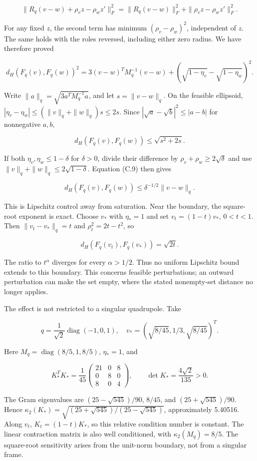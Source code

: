 \documentclass[
  11pt,
  a4paper]{article}
\begin{document}
\[
\|R_q(v-w)+\rho_vz-\rho_wz'\|_F^2
=\|R_q(v-w)\|_F^2+\|\rho_vz-\rho_wz'\|_F^2.
\]

For any fixed \(z\), the second term has minimum \((\rho_v-\rho_w)^2\), independent of \(z\). The same holds with the roles reversed, including either zero radius. We have therefore proved

\[
\boxed{d_H(F_q(v),F_q(w))^2
=3(v-w)^TM_q^{-1}(v-w)
+(\sqrt{1-\eta_v}-\sqrt{1-\eta_w})^2.}
\tag{C.9}
\]

Write \(\|a\|_q=\sqrt{3a^TM_q^{-1}a}\), and let \(s=\|v-w\|_q\). On the feasible ellipsoid,
\(|\eta_v-\eta_w|\le(\|v\|_q+\|w\|_q)s\le2s\).
Since \(|\sqrt a-\sqrt b|^2\le|a-b|\) for nonnegative \(a,b\),

\[
d_H(F_q(v),F_q(w))\le\sqrt{s^2+2s}.
\tag{C.10}
\]

If both \(\eta_v,\eta_w\le1-\delta\) for \(\delta>0\), divide their difference by \(\rho_v+\rho_w\ge2\sqrt\delta\) and use \(\|v\|_q+\|w\|_q\le2\sqrt{1-\delta}\). Equation (C.9) then gives

\[
d_H(F_q(v),F_q(w))\le\delta^{-1/2}\|v-w\|_q.
\tag{C.11}
\]

This is Lipschitz control away from saturation. Near the boundary, the square-root exponent is exact. Choose \(v_*\) with \(\eta_*=1\) and set \(v_t=(1-t)v_*\), \(0<t<1\). Then \(\|v_t-v_*\|_q=t\) and \(\rho_t^2=2t-t^2\), so

\[
\boxed{d_H(F_q(v_t),F_q(v_*))=\sqrt{2t}.}
\tag{C.12}
\]

The ratio to \(t^\alpha\) diverges for every \(\alpha>1/2\). Thus no uniform Lipschitz bound extends to this boundary. This concerns feasible perturbations; an outward perturbation can make the set empty, where the stated nonempty-set distance no longer applies.

The effect is not restricted to a singular quadrupole. Take

\[
q=\frac1{\sqrt2}\operatorname{diag}(-1,0,1),\quad
v_*=(\sqrt{8/45},1/3,\sqrt{8/45})^T.
\tag{C.13}
\]

Here \(M_q=\operatorname{diag}(8/5,1,8/5)\), \(\eta_*=1\), and

\[
K_*^TK_*=\frac1{45}
\begin{pmatrix}21&0&8\\0&8&0\\8&0&4\end{pmatrix},
\qquad
\det K_*=\frac{4\sqrt2}{135}>0.
\tag{C.14}
\]

The Gram eigenvalues are \((25-\sqrt{545})/90\), \(8/45\), and \((25+\sqrt{545})/90\). Hence \(\kappa_2(K_*)=\sqrt{(25+\sqrt{545})/(25-\sqrt{545})}\), approximately 5.40516. Along \(v_t\), \(K_t=(1-t)K_*\), so this relative condition number is constant. The linear contraction matrix is also well conditioned, with \(\kappa_2(M_q)=8/5\). The square-root sensitivity arises from the unit-norm boundary, not from a singular frame.
\end{document}
